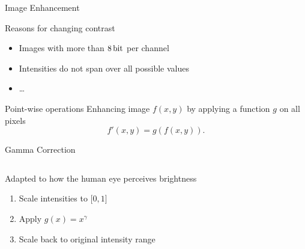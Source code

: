 \begin{frame}{Image Enhancement}
\begin{block}{Reasons for changing contrast}
\begin{itemize}
\item Images with more than $\SI{8}{\bit}$ per channel
\item Intensities do not span over all possible values
\item \ldots
\end{itemize}
\end{block}
\begin{block}{Point-wise operations}
Enhancing image $f(x,y)$ by applying a function $g$ on all pixels
\begin{equation*}
f'(x,y) = g(f(x,y)).
\end{equation*}
\end{block}
\end{frame}

\begin{frame}{Gamma Correction}
\begin{columns}[T, onlytextwidth]
\begin{column}{0.4\textwidth}
Adapted to how the human eye perceives brightness
\bigskip

\begin{enumerate}
\item Scale intensities to $\lbrack0,1\rbrack$
\item Apply $g(x) = x^\gamma$
\item Scale back to original intensity range
\end{enumerate}
\end{column}
\begin{column}{0.6\textwidth}
\end{column}
\end{columns}
\end{frame}

